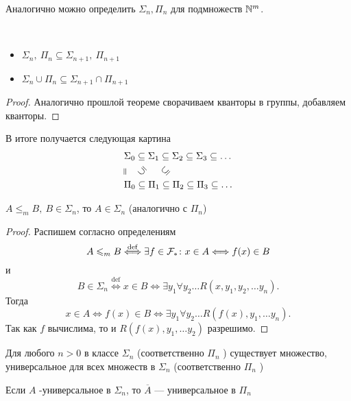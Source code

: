 \begin{note}
    Аналогично можно определить $ \Sigma _n, \Pi_n$ для подмножеств $ \mathbb{N}^{m}$.
\end{note}
\begin{prop}
	~\begin{itemize}
		\item $ \Sigma _n, ~ \Pi _n \subseteq \Sigma _{n+1}, ~\Pi_{n+1}$
	\item $ \Sigma _n \cup \Pi _n \subseteq \Sigma _{n+1} \cap \Pi _{n+1}$
	\end{itemize}
\end{prop}
\begin{proof}
    Аналогично прошлой теореме сворачиваем кванторы в группы, добавляем кванторы.
\end{proof}

В итоге получается следующая картина
\begin{align*}
	& \Sigma_0 \subseteq \Sigma _1 \subseteq  \Sigma _2 \subseteq \Sigma _3 \subseteq \ldots \\
	&\rotatebox[origin=c]{90}{=} \quad \rotatebox[origin=c]{135}{$\subseteq$} \quad~  \rotatebox[origin=c]{45}{$\subseteq$}\\
	& \Pi_0 \subseteq \Pi _1 \subseteq  \Pi _2 \subseteq \Pi _3 \subseteq \ldots
\end{align*}

\begin{thm}
    $ A \le _m B ,  ~ B \in \Sigma _n$, то $ A \in \Sigma _{n}$ (аналогично с $ \Pi_n$)   
\end{thm}
\begin{proof}
	Распишем согласно определениям
	\[
		A \leqslant _m B \stackrel{\operatorname{def}}{\Longleftrightarrow }  \exists f \in \mathcal{F}_{*}\colon x \in A \Longleftrightarrow f(x) \in  B
	\] 
	и
	\[
		B \in \Sigma _n \stackrel{\operatorname{def}}{\Longleftrightarrow } x \in B \Longleftrightarrow \exists y_1 \forall y_2 \ldots R(x, y_1, y_2, \ldots y_n)
	.\] 
	Тогда 
	\[
		x \in A \Longleftrightarrow f(x) \in B \Longleftrightarrow \exists y_1 \forall y_2 \ldots R(f(x), y_1, \ldots y_{n})
	.\] 
	Так как $ f$ вычислима, то и $ R(f(x), y_1, \ldots y_2)$ разрешимо.
\end{proof}

\begin{thm}
    Для любого $ n>0$ в классе $ \Sigma_n $ (соответственно $ \Pi_n$ ) существует множество, универсальное для всех множеств в $ \Sigma _n$ (соответственно $ \Pi_n $ ) 
\end{thm}
\begin{note}
    Если $ A$ -универсальное в $ \Sigma _n$, то $ \overline{A}$ --- универсальное в $ \Pi_n$
\end{note}

